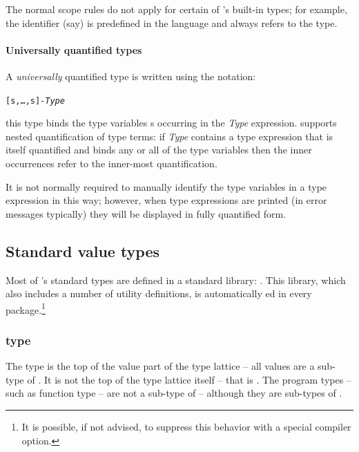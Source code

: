 The normal scope rules do not apply for certain of \go's built-in types; for example, the identifier  (say) is predefined in the language and always refers to the  type.

\paragraph{Universally quantified types}
A \emph{universally} quantified type is written using the notation:
\begin{alltt}
[s,\ldots,s\subn]-\emph{Type}
\end{alltt}
this type binds the type variables s\subi{} occurring in the \emph{Type} expression. \go supports nested quantification of type terms: if \emph{Type} contains a type expression that is itself quantified and binds any or all of the  type variables then the inner occurrences refer to the inner-most quantification.

It is not normally required to manually identify the type variables in a type expression in this way; however, when type expressions are printed (in error messages typically) they will be displayed in fully quantified form.


\subsection{Standard value types}
\label{types:standard}

Most of \go's standard types are defined in a standard library: . This library, which also includes a number of utility definitions, is automatically ed in every package.\footnote{It is possible, if not advised, to suppress this behavior with a special compiler option.}

\subsubsection{ type}
\label{types:standard:thing}


The  type is the top of the value part of the type lattice -- all values are a sub-type of . It is not the top of the type lattice itself -- that is . The program types -- such as function type -- are not a sub-type of  -- although they are sub-types of .

